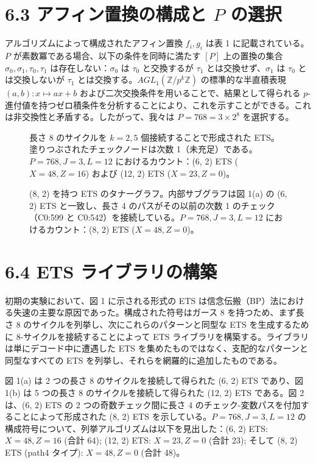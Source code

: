 \documentclass[a4paper,11pt,dvipdfmx]{jsarticle}
\theoremstyle{definition}
\begin{document}
\section*{6.3 アフィン置換の構成と $P$ の選択}

アルゴリズムによって構成されたアフィン置換 $f_i, g_i$ は表 1 に記載されている。$P$ が素数冪である場合、以下の条件を同時に満たす $[P]$ 上の置換の集合 $\sigma_0, \sigma_1, \tau_0, \tau_1$ は存在しない：$\sigma_0$ は $\tau_0$ と交換するが $\tau_1$ とは交換せず、$\sigma_1$ は $\tau_0$ とは交換しないが $\tau_1$ とは交換する。$AGL_1(\mathbb{Z}/p^k \mathbb{Z})$ の標準的な半直積表現 $(a, b) : x \mapsto ax + b$ および二次交換条件を用いることで、結果として得られる $p$-進付値を持つゼロ積条件を分析することにより、これを示すことができる。これは非交換性と矛盾する。したがって、我々は $P = 768 = 3 \times 2^8$ を選択する。

\begin{figure}[h]
\centering
\caption{長さ 8 のサイクルを $k = 2, 5$ 個接続することで形成された ETS。塗りつぶされたチェックノードは次数 1（未充足）である。$P = 768, J = 3, L = 12$ におけるカウント：(6, 2) ETS ($X=48, Z=16$) および (12, 2) ETS ($X=23, Z=0$)。}
\end{figure}

\begin{figure}[h]
\centering
\caption{(8, 2) を持つ ETS のタナーグラフ。内部サブグラフは図 1(a) の (6, 2) ETS と一致し、長さ 4 のパスがその以前の次数 1 のチェック（C0:599 と C0:542）を接続している。$P = 768, J = 3, L = 12$ におけるカウント：(8, 2) ETS ($X=48, Z=0$)。}
\end{figure}

\section*{6.4 ETS ライブラリの構築}

初期の実験において、図 1 に示される形式の ETS は信念伝搬（BP）法における失速の主要な原因であった。構成された符号はガース 8 を持つため、まず長さ 8 のサイクルを列挙し、次にこれらのパターンと同型な ETS を生成するために 8-サイクルを接続することによって ETS ライブラリを構築する。ライブラリは単にデコード中に遭遇した ETS を集めたものではなく、支配的なパターンと同型なすべての ETS を列挙し、それらを網羅的に追加したものである。

図 1(a) は 2 つの長さ 8 のサイクルを接続して得られた (6, 2) ETS であり、図 1(b) は 5 つの長さ 8 のサイクルを接続して得られた (12, 2) ETS である。図 2 は、(6, 2) ETS の 2 つの奇数チェック間に長さ 4 のチェック-変数パスを付加することによって形成された (8, 2) ETS を示している。$P = 768, J = 3, L = 12$ の構成符号について、列挙アルゴリズムは以下を見出した：(6, 2) ETS: $X = 48, Z = 16$ (合計 64); (12, 2) ETS: $X = 23, Z = 0$ (合計 23); そして (8, 2) ETS (path4 タイプ): $X = 48, Z = 0$ (合計 48)。
\end{document}
